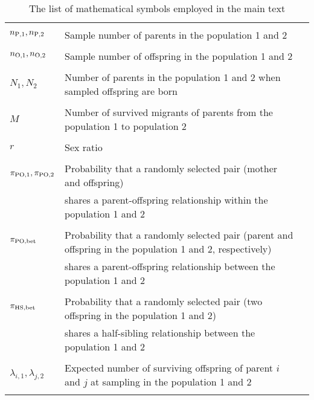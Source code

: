 \documentclass[12pt, English]{article}
\begin{document}
\begin{spacing}{1.9}
\renewcommand{\arraystretch}{0.6}
\begin{table}[tb]
\begin{center}
   \caption[]{The list of mathematical symbols employed in the main text}
    \textbf {}\\[-4mm]
    \begin{tabular}{llc} \hline
       & & \\
	$n_{\rm P,1}, n_{\rm P, 2}$			& Sample number of parents in the population 1 and 2\\ 
		                						& \\
	$n_{\rm O, 1}, n_{\rm O, 2}$			& Sample number of offspring in the population 1 and 2\\ 
		                						& \\
	$N_{1}, N_{2}$						& Number of parents in the population 1 and 2 when sampled offspring are born\\
		                						& \\
	$M$								& Number of survived migrants of parents from the population 1 to population 2\\
		                						& \\
	$r$								& Sex ratio\\
		                						& \\
	$\pi_{\rm PO,1}, \pi_{\rm PO,2}$		& Probability that a randomly selected pair (mother and offspring) \\
	                							& shares a parent-offspring relationship within the population 1 and 2\\
									& \\
	$\pi_{\rm PO, bet}$					& Probability that a randomly selected pair (parent and offspring in the population 1 and 2, respectively) \\
	                							& shares a parent-offspring relationship between the population 1 and 2\\
									& \\
	$\pi_{\rm HS, bet}$					& Probability that a randomly selected pair (two offspring in the population 1 and 2) \\
	                							& shares a half-sibling relationship between the population 1 and 2\\
					                			& \\
	$\lambda_{i,1}, \lambda_{j,2}$			& Expected number of surviving offspring of parent $i$ and $j$ at sampling in the population 1 and 2\\
		                						& \\

\end{tabular}
\end{center}
\end{table}
\end{spacing}
\end{document}
